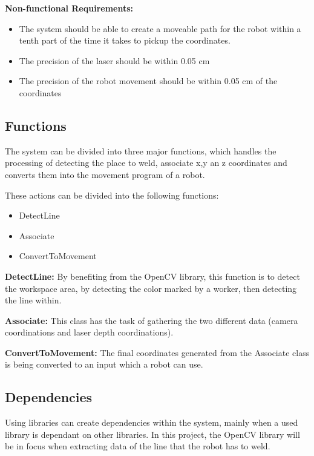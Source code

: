 \documentclass[12pt]{report} %
\begin{document}
\textbf{Non-functional Requirements:}

\begin{itemize}

\item The system should be able to create a moveable path for the robot within a tenth part of the time it takes to pickup the coordinates.
\item The precision of the laser should be within 0.05 cm
\item The precision of the robot movement should be within 0.05 cm of the coordinates

\end{itemize}

\subsection{Functions}

The system can be divided into three major functions, which handles the processing of detecting the place to weld, associate x,y an z coordinates and converts them into the movement program of a robot.

These actions can be divided into the following functions:

\begin{itemize}

\item DetectLine
\item Associate
\item ConvertToMovement

\end{itemize}

\textbf{DetectLine:}
By benefiting from the OpenCV library, this function is to detect the workspace area, by detecting the color marked by a worker, then detecting the line within.   

\textbf{Associate:}
This class has the task of gathering the two different data (camera coordinations and laser depth coordinations).

\textbf{ConvertToMovement:}
The final coordinates generated from the Associate class is being converted to an input which a robot can use. 

\subsection{Dependencies}
Using libraries can create dependencies within the system, mainly when a used library is dependant on other libraries. In this project, the OpenCV library will be in focus when extracting data of the line that the robot has to weld.   
\end{document}
